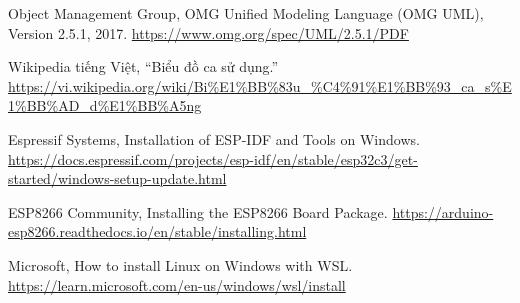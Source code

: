 \documentclass[12pt,letterpaper]{report}
\begin{document}
\begin{enumerate}[label={[\arabic*]}]
\item \label{src:uml}Object Management Group, OMG Unified Modeling Language (OMG UML), Version 2.5.1,
  2017. \url{https://www.omg.org/spec/UML/2.5.1/PDF}
\item Wikipedia tiếng Việt, ``Biểu đồ ca sử dụng.''
  \url{https://vi.wikipedia.org/wiki/Bi%E1%BB%83u_%C4%91%E1%BB%93_ca_s%E1%BB%AD_d%E1%BB%A5ng}
\item \label{src:eim}Espressif Systems, Installation of ESP-IDF and Tools on Windows. \url{https://docs.espressif.com/projects/esp-idf/en/stable/esp32c3/get-started/windows-setup-update.html}
\item \label{src:esp8266install}ESP8266 Community, Installing the ESP8266 Board Package. \url{https://arduino-esp8266.readthedocs.io/en/stable/installing.html}
\item \label{src:wsl}Microsoft, How to install Linux on Windows with WSL. \url{https://learn.microsoft.com/en-us/windows/wsl/install}
\end{enumerate}
\end{document}
